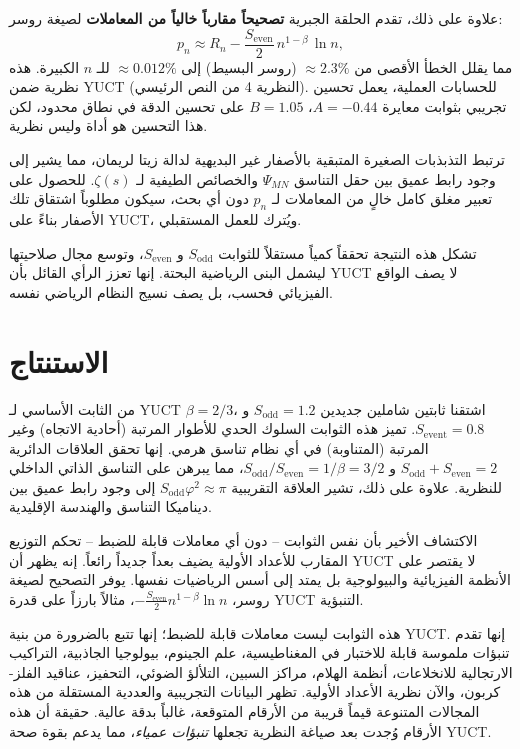 \documentclass[11pt,a4paper]{article}
\begin{document}
	علاوة على ذلك، تقدم الحلقة الجبرية \textbf{تصحيحاً مقارباً خالياً من المعاملات} لصيغة روسر:
	\[
	p_n \approx R_n - \frac{S_{\mathrm{even}}}{2}\, n^{1-\beta}\,\ln n,
	\]
	مما يقلل الخطأ الأقصى من \(\approx 2.3\%\) (روسر البسيط) إلى \(\approx 0.012\%\) للـ \(n\) الكبيرة. هذه نظرية ضمن YUCT (النظرية 4 من النص الرئيسي). للحسابات العملية، يعمل تحسين تجريبي بثوابت معايرة \(A=-0.44\)، \(B=1.05\) على تحسين الدقة في نطاق محدود، لكن هذا التحسين هو أداة وليس نظرية.
	
	ترتبط التذبذبات الصغيرة المتبقية بالأصفار غير البديهية لدالة زيتا لريمان، مما يشير إلى وجود رابط عميق بين حقل التناسق \(\Psi_{MN}\) والخصائص الطيفية لـ \(\zeta(s)\). للحصول على تعبير مغلق كامل خالٍ من المعاملات لـ \(p_n\) دون أي بحث، سيكون مطلوباً اشتقاق تلك الأصفار بناءً على YUCT، ويُترك للعمل المستقبلي.
	
	تشكل هذه النتيجة تحققاً كمياً مستقلاً للثوابت \(S_{\mathrm{odd}}\) و \(S_{\mathrm{even}}\)، وتوسع مجال صلاحيتها ليشمل البنى الرياضية البحتة. إنها تعزز الرأي القائل بأن YUCT لا يصف الواقع الفيزيائي فحسب، بل يصف نسيج النظام الرياضي نفسه.
	
	\section{الاستنتاج}
	من الثابت الأساسي لـ YUCT \(\beta = 2/3\)، اشتقنا ثابتين شاملين جديدين \(S_{\text{odd}} = 1.2\) و \(S_{\text{event}} = 0.8\). تميز هذه الثوابت السلوك الحدي للأطوار المرتبة (أحادية الاتجاه) وغير المرتبة (المتناوبة) في أي نظام تناسق هرمي. إنها تحقق العلاقات الدائرية \(S_{\text{odd}}+S_{\text{even}}=2\) و \(S_{\text{odd}}/S_{\text{even}} = 1/\beta = 3/2\)، مما يبرهن على التناسق الذاتي الداخلي للنظرية. علاوة على ذلك، تشير العلاقة التقريبية \(S_{\text{odd}}\varphi^2 \approx \pi\) إلى وجود رابط عميق بين ديناميكا التناسق والهندسة الإقليدية.
	
	الاكتشاف الأخير بأن نفس الثوابت -- دون أي معاملات قابلة للضبط -- تحكم التوزيع المقارب للأعداد الأولية يضيف بعداً جديداً رائعاً. إنه يظهر أن YUCT لا يقتصر على الأنظمة الفيزيائية والبيولوجية بل يمتد إلى أسس الرياضيات نفسها. يوفر التصحيح لصيغة روسر، \(-\frac{S_{\text{even}}}{2}n^{1-\beta}\ln n\)، مثالاً بارزاً على قدرة YUCT التنبؤية.
	
	هذه الثوابت ليست معاملات قابلة للضبط؛ إنها تتبع بالضرورة من بنية YUCT. إنها تقدم تنبؤات ملموسة قابلة للاختبار في المغناطيسية، علم الجينوم، بيولوجيا الجاذبية، التراكيب الارتجالية للانخلاعات، أنظمة الهلام، مراكز السبين، التلألؤ الضوئي، التحفيز، عناقيد الفلز-كربون، والآن نظرية الأعداد الأولية. تظهر البيانات التجريبية والعددية المستقلة من هذه المجالات المتنوعة قيماً قريبة من الأرقام المتوقعة، غالباً بدقة عالية. حقيقة أن هذه الأرقام وُجدت بعد صياغة النظرية تجعلها \textit{تنبؤات عمياء}، مما يدعم بقوة صحة YUCT.
	
\end{document}
